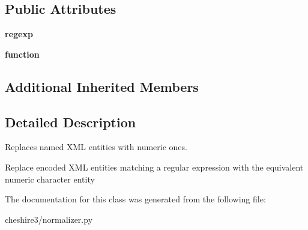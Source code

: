 \subsection*{Public Attributes}
\begin{DoxyCompactItemize}
\item 
\hypertarget{classcheshire3_1_1normalizer_1_1_numeric_entity_normalizer_a5b4b82fcd357adfb0d45bb159b12dade}{{\bfseries regexp}}\label{classcheshire3_1_1normalizer_1_1_numeric_entity_normalizer_a5b4b82fcd357adfb0d45bb159b12dade}

\item 
\hypertarget{classcheshire3_1_1normalizer_1_1_numeric_entity_normalizer_a0095fd3e722a66946413f7c3e566f34a}{{\bfseries function}}\label{classcheshire3_1_1normalizer_1_1_numeric_entity_normalizer_a0095fd3e722a66946413f7c3e566f34a}

\end{DoxyCompactItemize}
\subsection*{Additional Inherited Members}


\subsection{Detailed Description}
\begin{DoxyVerb}Replaces named XML entities with numeric ones.

Replace encoded XML entities matching a regular expression with the 
equivalent numeric character entity
\end{DoxyVerb}
 

The documentation for this class was generated from the following file\-:\begin{DoxyCompactItemize}
\item 
cheshire3/normalizer.\-py\end{DoxyCompactItemize}
